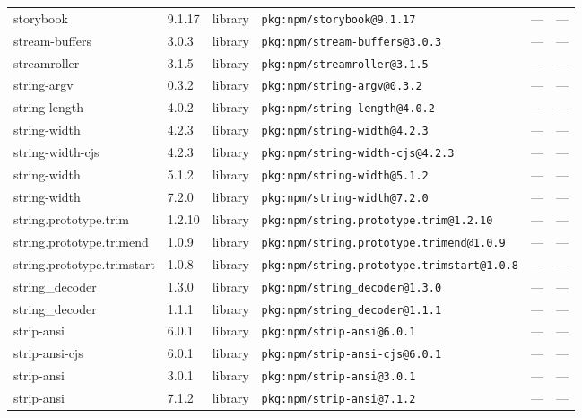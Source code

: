 \documentclass[11pt,a4paper]{article}
\begin{document}
\begin{longtable}{|p{4cm}|p{2cm}|p{1.6cm}|p{5cm}|p{1.5cm}|p{3.5cm}|}
\raggedright storybook & 9.1.17 & library & \small\texttt{pkg:npm/storybook@9.1.17} & — & \small — \\
\raggedright stream-buffers & 3.0.3 & library & \small\texttt{pkg:npm/stream-buffers@3.0.3} & — & \small — \\
\raggedright streamroller & 3.1.5 & library & \small\texttt{pkg:npm/streamroller@3.1.5} & — & \small — \\
\raggedright string-argv & 0.3.2 & library & \small\texttt{pkg:npm/string-argv@0.3.2} & — & \small — \\
\raggedright string-length & 4.0.2 & library & \small\texttt{pkg:npm/string-length@4.0.2} & — & \small — \\
\raggedright string-width & 4.2.3 & library & \small\texttt{pkg:npm/string-width@4.2.3} & — & \small — \\
\raggedright string-width-cjs & 4.2.3 & library & \small\texttt{pkg:npm/string-width-cjs@4.2.3} & — & \small — \\
\raggedright string-width & 5.1.2 & library & \small\texttt{pkg:npm/string-width@5.1.2} & — & \small — \\
\raggedright string-width & 7.2.0 & library & \small\texttt{pkg:npm/string-width@7.2.0} & — & \small — \\
\raggedright string.prototype.trim & 1.2.10 & library & \small\texttt{pkg:npm/string.prototype.trim@1.2.10} & — & \small — \\
\raggedright string.prototype.trimend & 1.0.9 & library & \small\texttt{pkg:npm/string.prototype.trimend@1.0.9} & — & \small — \\
\raggedright string.prototype.trimstart & 1.0.8 & library & \small\texttt{pkg:npm/string.prototype.trimstart@1.0.8} & — & \small — \\
\raggedright string\_decoder & 1.3.0 & library & \small\texttt{pkg:npm/string\_decoder@1.3.0} & — & \small — \\
\raggedright string\_decoder & 1.1.1 & library & \small\texttt{pkg:npm/string\_decoder@1.1.1} & — & \small — \\
\raggedright strip-ansi & 6.0.1 & library & \small\texttt{pkg:npm/strip-ansi@6.0.1} & — & \small — \\
\raggedright strip-ansi-cjs & 6.0.1 & library & \small\texttt{pkg:npm/strip-ansi-cjs@6.0.1} & — & \small — \\
\raggedright strip-ansi & 3.0.1 & library & \small\texttt{pkg:npm/strip-ansi@3.0.1} & — & \small — \\
\raggedright strip-ansi & 7.1.2 & library & \small\texttt{pkg:npm/strip-ansi@7.1.2} & — & \small — \\

\end{longtable}
\end{document}
